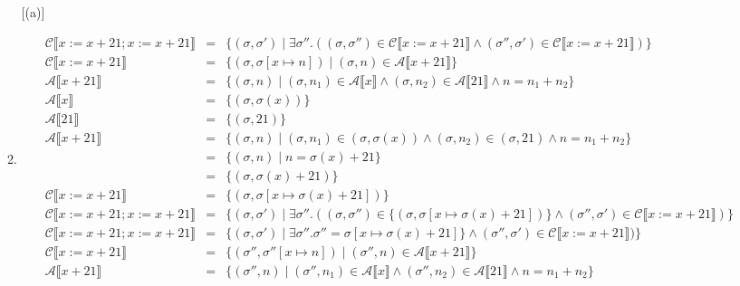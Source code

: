 \documentclass[10pt, oneside]{article}
\begin{document}
\begin{enumerate}[1.]
\begin{enumerate} [(a)]
    \item  \begin{eqnarray*}  \mathcal{C} \llbracket x := x + 21; x := x + 21 \rrbracket & = & \{ (\sigma, \sigma') \mid \exists \sigma''.  ((\sigma, \sigma'') \in \mathcal{C} \llbracket x := x + 21\rrbracket \wedge (\sigma'', \sigma') \in \mathcal{C} \llbracket x := x + 21\rrbracket )\}\\
    \mathcal{C} \llbracket x := x + 21\rrbracket & = & \{ (\sigma, \sigma[x \mapsto n]) \mid (\sigma, n) \in \mathcal{A} \llbracket x + 21 \rrbracket \} \\
     \mathcal{A} \llbracket x + 21\rrbracket & = & \{ (\sigma, n) \mid (\sigma, n_1) \in \mathcal{A} \llbracket x \rrbracket \wedge (\sigma, n_2) \in \mathcal{A} \llbracket 21 \rrbracket \wedge n = n_1 + n _2\} \\
       \mathcal{A} \llbracket x \rrbracket  & = & \{ (\sigma, \sigma(x)) \} \\
    \mathcal{A} \llbracket 21 \rrbracket  & = & \{ (\sigma, 21) \} \\
    \mathcal{A} \llbracket x + 21 \rrbracket & = & \{ (\sigma, n) \mid (\sigma, n_1) \in (\sigma, \sigma(x)) \wedge (\sigma, n_2) \in (\sigma, 21) \wedge n = n_1 + n_2 \} \\
    & = & \{ (\sigma, n) \mid n = \sigma(x) + 21 \} \\
    & = & \{ (\sigma, \sigma(x) + 21) \} \\
      \mathcal{C} \llbracket x := x + 21\rrbracket & = & \{ (\sigma, \sigma[x \mapsto \sigma(x) + 21]) \} \\
     \mathcal{C} \llbracket x := x + 21; x := x + 21 \rrbracket & = & \{ (\sigma, \sigma') \mid \exists \sigma''.  ((\sigma, \sigma'') \in  \{ (\sigma, \sigma[x \mapsto \sigma(x) + 21]) \} \wedge (\sigma'', \sigma') \in \mathcal{C} \llbracket x := x + 21\rrbracket )\}\\
      \mathcal{C} \llbracket x := x + 21; x := x + 21 \rrbracket & = & \{ (\sigma, \sigma') \mid \exists \sigma''.  \sigma'' = \sigma[x \mapsto \sigma(x) + 21] \} \wedge (\sigma'', \sigma') \in \mathcal{C} \llbracket x := x + 21\rrbracket )\}\\
       \mathcal{C} \llbracket x := x + 21\rrbracket & = & \{ (\sigma'', \sigma''[x \mapsto n]) \mid (\sigma'', n) \in \mathcal{A} \llbracket x + 21 \rrbracket \} \\
     \mathcal{A} \llbracket x + 21\rrbracket & = & \{ (\sigma'', n) \mid (\sigma'', n_1) \in \mathcal{A} \llbracket x \rrbracket \wedge (\sigma'', n_2) \in \mathcal{A} \llbracket 21 \rrbracket \wedge n = n_1 + n _2\} \\

\end{eqnarray*}
\end{enumerate}
\end{enumerate}
\end{document}
